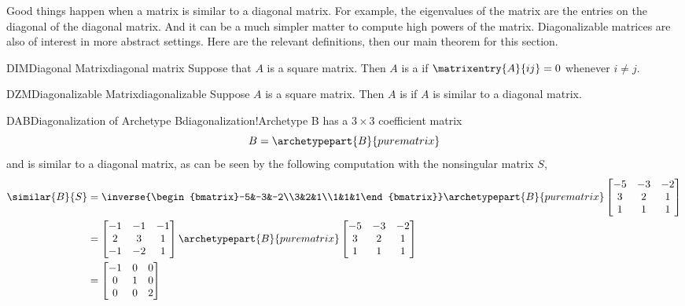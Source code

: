 %
%
Good things happen when a matrix is similar to a diagonal matrix.  For example, the eigenvalues of the matrix are the  entries on the diagonal of the diagonal matrix.  And it can be a much simpler matter to compute high powers of the matrix.  Diagonalizable matrices are also of interest in more abstract settings.  Here are the relevant definitions, then our main theorem for this section.
%
\begin{definition}{DIM}{Diagonal Matrix}{diagonal matrix}
Suppose that $A$ is a square matrix.  Then $A$ is a  if $\matrixentry{A}{ij}=0$ whenever $i\neq j$.
\end{definition}
%
%
\begin{definition}{DZM}{Diagonalizable Matrix}{diagonalizable}
Suppose $A$ is a square matrix.  Then $A$ is  if $A$ is similar to a diagonal matrix.
\end{definition}
%
%
\begin{example}{DAB}{Diagonalization of Archetype B}{diagonalization!Archetype B}
%
 has a $3\times 3$ coefficient matrix
%
%
\begin{equation*}
B=\archetypepart{B}{purematrix}
\end{equation*}
%
and is similar to a diagonal matrix, as can be seen by the following computation with the nonsingular matrix $S$,
%
\begin{align*}
\similar{B}{S}&=
\inverse{\begin{bmatrix}-5&-3&-2\\3&2&1\\1&1&1\end{bmatrix}}
\archetypepart{B}{purematrix}
\begin{bmatrix}-5&-3&-2\\3&2&1\\1&1&1\end{bmatrix}\\
%
&=\begin{bmatrix}-1&-1&-1\\2&3&1\\-1&-2&1\end{bmatrix}
\archetypepart{B}{purematrix}
\begin{bmatrix}-5&-3&-2\\3&2&1\\1&1&1\end{bmatrix}\\
%
&=
\begin{bmatrix}-1&0&0\\0&1&0\\0&0&2\end{bmatrix}
%
\end{align*}
%
\end{example}
